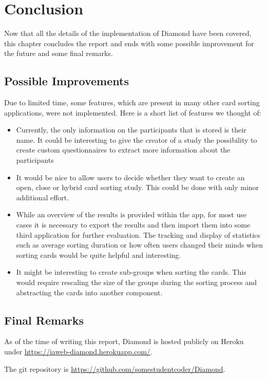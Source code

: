 \chapter{Conclusion}

\label{chap:Concl}

Now that all the details of the implementation of Diamond have been covered, 
this chapter concludes the report and ends with some possible improvement for 
the future and some final remarks.

\section{Possible Improvements}

Due to limited time, some features, which are present in many other card 
sorting applications, were not implemented. Here is a short list of features we 
thought of:

\begin{itemize}
  \item Currently, the only information on the participants that is stored is 
  their name. It could be interesting to give the creator of a study the 
  possibility to create custom questionnaires  to extract more information 
  about the participants
  \item It would be nice to allow users to decide whether they want to create 
  an open, close or hybrid card sorting study. This could be done with only 
  minor additional effort. 
  \item While an overview of the results is provided within the app, for most 
  use cases it is necessary to export the results and then import them into some
  third application for further evaluation. The tracking and display of 
  statistics such as average sorting duration or how often users changed their 
  minds when sorting cards would be quite helpful and interesting.
  \item It might be interesting to create sub-groups when sorting the cards. 
  This would require rescaling the size of the groups during the sorting process
  and abstracting the cards into another component.
\end{itemize}



\section{Final Remarks}

As of the time of writing this report, Diamond is hosted publicly on Heroku 
under \url{https://iaweb-diamond.herokuapp.com/}.

The git repository is 
\url{https://github.com/somestudentcoder/Diamond}.


